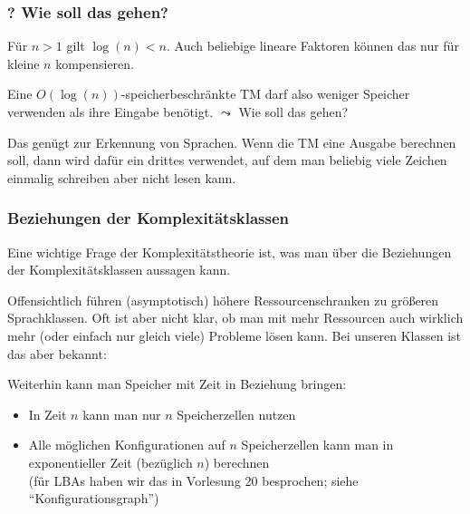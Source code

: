 \documentclass[aspectratio=1610,onlymath]{beamer}
\begin{document}
\begin{frame}\frametitle{? Wie soll das gehen?}

Für $n>1$ gilt \alert{$\log(n)<n$}. Auch beliebige lineare Faktoren können das nur für kleine $n$ kompensieren.\\
\medskip

Eine $O(\log(n))$-speicherbeschränkte TM darf also weniger Speicher verwenden als ihre Eingabe benötigt.
\alert{$\leadsto$ Wie soll das gehen?}
\bigskip\pause


{\footnotesize
Das genügt zur Erkennung von Sprachen. Wenn die TM eine Ausgabe berechnen soll, dann wird dafür ein 
drittes  verwendet, auf dem man beliebig viele Zeichen einmalig schreiben aber nicht lesen kann.\\
}

\end{frame}

\begin{frame}\frametitle{Beziehungen der Komplexitätsklassen}

\alert{Eine wichtige Frage der Komplexitätstheorie ist, was man über die Beziehungen der
Komplexitätsklassen aussagen kann.}
\medskip\pause

Offensichtlich führen (asymptotisch) höhere Ressourcenschranken zu größeren Sprachklassen.
Oft ist aber nicht klar, ob man mit mehr Ressourcen auch wirklich mehr (oder einfach nur gleich viele) Probleme lösen kann. Bei
unseren Klassen ist das aber bekannt:\medskip

\medskip\pause

Weiterhin kann man Speicher mit Zeit in Beziehung bringen:
\begin{itemize}
\item In Zeit $n$ kann man nur $n$ Speicherzellen nutzen
\item Alle möglichen Konfigurationen auf $n$ Speicherzellen kann man in exponentieller Zeit (bezüglich $n$) berechnen\\[-1ex]
{\tiny (für LBAs haben wir das in Vorlesung 20 besprochen; siehe "`Konfigurationsgraph"')}
\end{itemize}


\end{frame}
\end{document}
